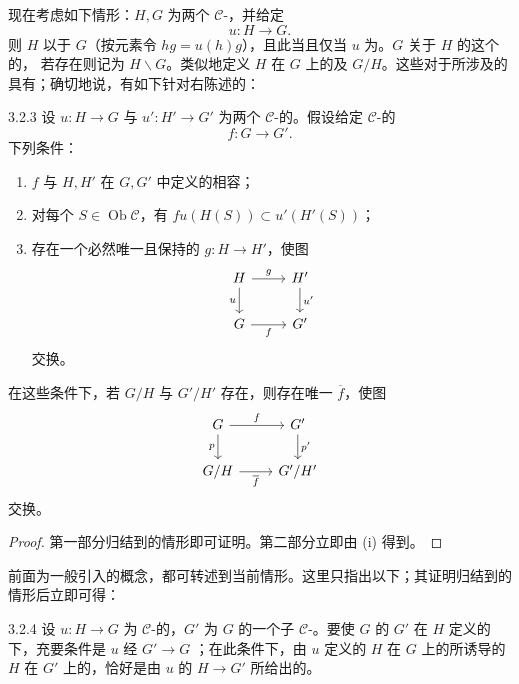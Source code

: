现在考虑如下情形：$H,G$ 为两个 $\mathcal C$-，并给定
\[
 u:H\longrightarrow G.
\]
则 $H$ 以于 $G$（按元素令 $hg=u(h)g$），且此当且仅当 $u$ 为。$G$ 关于 $H$ 的这个的，
若存在则记为 $H\backslash G$。类似地定义 $H$ 在 $G$ 上的及 $G/H$。这些对于所涉及的具有；确切地说，有如下针对右陈述的：
\begin{SGAresult}{}{3.2.3}
设 $u:H\to G$ 与 $u':H'\to G'$ 为两个 $\mathcal C$-的。假设给定 $\mathcal C$-的
\[
 f:G\longrightarrow G'.
\]
下列条件：
\begin{enumerate}
\item[(i)] $f$ 与 $H,H'$ 在 $G,G'$ 中定义的相容；
\item[(ii)] 对每个 $S\in\operatorname{Ob}\mathcal C$，有 $fu(H(S))\subset u'(H'(S))$；
\item[(iii)] 存在一个必然唯一且保持的 $g:H\to H'$，使图
\[
\begin{tikzcd}H\arrow[r,"g"]\arrow[d,"u"']&H'\arrow[d,"u'"]\\G\arrow[r,"f"']&G'\end{tikzcd}
\]
交换。
\end{enumerate}
在这些条件下，若 $G/H$ 与 $G'/H'$ 存在，则存在唯一 $\overline f$，使图
\[
\begin{tikzcd}G\arrow[r,"f"]\arrow[d,"p"']&G'\arrow[d,"p'"]\\G/H\arrow[r,"\overline f"']&G'/H'\end{tikzcd}
\]
交换。
\end{SGAresult}
\begin{proof}
第一部分归结到的情形即可证明。第二部分立即由 (i) 得到。
\end{proof}
前面为一般引入的概念，都可转述到当前情形。这里只指出以下；其证明归结到的情形后立即可得：
\begin{SGAresult}{}{3.2.4}
设 $u:H\to G$ 为 $\mathcal C$-的，$G'$ 为 $G$ 的一个子 $\mathcal C$-。要使 $G$ 的 $G'$ 在 $H$ 定义的下，充要条件是 $u$ 经 $G'\to G$ ；在此条件下，由 $u$ 定义的 $H$ 在 $G$ 上的所诱导的 $H$ 在 $G'$ 上的，恰好是由 $u$ 的 $H\to G'$ 所给出的。
\end{SGAresult}
